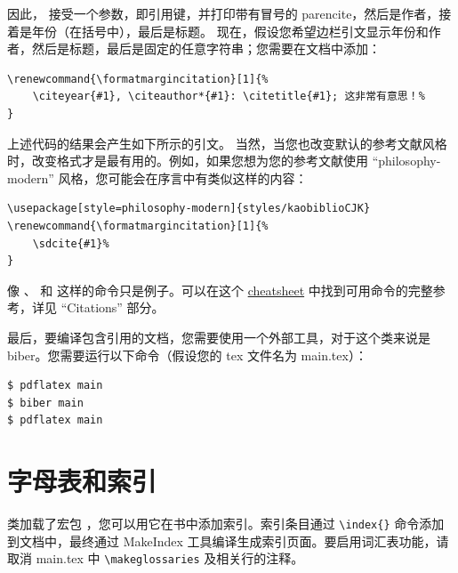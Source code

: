 因此， 接受一个参数，即引用键，并打印带有冒号的 parencite，然后是作者，接着是年份（在括号中），最后是标题。 现在，假设您希望边栏引文显示年份和作者，然后是标题，最后是固定的任意字符串；您需要在文档中添加：

\begin{lstlisting}[style=kaolstplain]
\renewcommand{\formatmargincitation}[1]{%
	\citeyear{#1}, \citeauthor*{#1}: \citetitle{#1}; 这非常有意思！%
}
\end{lstlisting}

\renewcommand{\formatmargincitation}[1]{%
	\citeyear{#1}, \citeauthor*{#1}: \citetitle{#1}; 这非常有意思！%
}

上述代码的结果会产生如下所示的引文。 当然，当您也改变默认的参考文献风格时，改变格式才是最有用的。例如，如果您想为您的参考文献使用 \enquote{philosophy-modern} 风格，您可能会在序言中有类似这样的内容：

\begin{lstlisting}[style=kaolstplain,linewidth=1.5\textwidth]
\usepackage[style=philosophy-modern]{styles/kaobiblioCJK}
\renewcommand{\formatmargincitation}[1]{%
	\sdcite{#1}%
}

\end{lstlisting}

\renewcommand{\formatmargincitation}[1]{%
	\parencite{#1}: \citeauthor*{#1} (\citeyear{#1}), \citetitle{#1}%
}

像 、 和  这样的命令只是例子。可以在这个 \href{http://tug.ctan.org/info/biblatex-cheatsheet/biblatex-cheatsheet.pdf}{cheatsheet} 中找到可用命令的完整参考，详见 \enquote{Citations} 部分。

最后，要编译包含引用的文档，您需要使用一个外部工具，对于这个类来说是 biber。您需要运行以下命令（假设您的 tex 文件名为 main.tex）：

\begin{lstlisting}[style=kaolstplain]
$ pdflatex main
$ biber main
$ pdflatex main
\end{lstlisting}

\section{字母表和索引}

 类加载了宏包 ，您可以用它在书中添加索引。索引条目通过 \lstinline|\index{}| 命令添加到文档中，最终通过 MakeIndex 工具编译生成索引页面。要启用词汇表功能，请取消 main.tex 中 \lstinline|\makeglossaries| 及相关行的注释。

